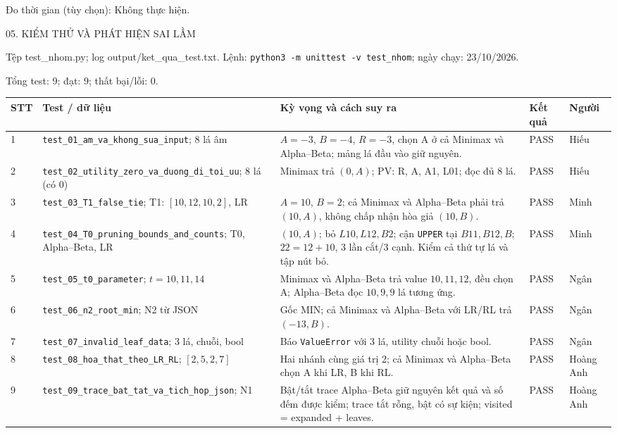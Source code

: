 \documentclass[11pt,a4paper]{article}
\newcommand{\pagehead}[1]{\clearpage\begin{tcolorbox}[colback=Ink,colframe=Ink,coltext=white,fontupper=\sffamily\large\bfseries,arc=1mm]#1\end{tcolorbox}}
\newcommand{\code}[1]{\nolinkurl{#1}}
\begin{document}
Đo thời gian (tùy chọn): Không thực hiện.\par\medskip
\pagehead{05. KIỂM THỬ VÀ PHÁT HIỆN SAI LẦM}
Tệp test\_nhom.py; log output/ket\_qua\_test.txt. Lệnh: \texttt{python3 -m unittest -v test\_nhom}; ngày chạy: 23/10/2026.\par Tổng test: 9; đạt: 9; thất bại/lỗi: 0.\par\medskip
\begingroup\footnotesize\renewcommand{\arraystretch}{1.45}\begin{tabularx}{\linewidth}{p{9mm}Xp{48mm}p{21mm}p{18mm}}\toprule
\textbf{STT} & \textbf{Test / dữ liệu} & \textbf{Kỳ vọng và cách suy ra} & \textbf{Kết quả} & \textbf{Người}\\\midrule
1 & \code{test_01_am_va_khong_sua_input}; 8 lá âm & $A=-3$, $B=-4$, $R=-3$, chọn A ở cả Minimax và Alpha--Beta; mảng lá đầu vào giữ nguyên. & PASS & Hiếu\\
2 & \code{test_02_utility_zero_va_duong_di_toi_uu}; 8 lá (có 0) & Minimax trả $(0,A)$; PV: R, A, A1, L01; đọc đủ 8 lá. & PASS & Hiếu\\
3 & \code{test_03_T1_false_tie}; T1: $[10,12,10,2]$, LR & $A=10$, $B=2$; cả Minimax và Alpha--Beta phải trả $(10,A)$, không chấp nhận hòa giả $(10,B)$. & PASS & Minh\\
4 & \code{test_04_T0_pruning_bounds_and_counts}; T0, Alpha--Beta, LR & $(10,A)$; bỏ $L10,L12,B2$; cận \texttt{UPPER} tại $B11,B12,B$; $22=12+10$, 3 lần cắt/3 cạnh. Kiểm cả thứ tự lá và tập nút bỏ. & PASS & Minh\\
5 & \code{test_05_t0_parameter}; $t=10,11,14$ & Minimax và Alpha--Beta trả value $10,11,12$, đều chọn A; Alpha--Beta đọc $10,9,9$ lá tương ứng. & PASS & Ngân\\
6 & \code{test_06_n2_root_min}; N2 từ JSON & Gốc MIN; cả Minimax và Alpha--Beta với LR/RL trả $(-13,B)$. & PASS & Ngân\\
7 & \code{test_07_invalid_leaf_data}; 3 lá, chuỗi, bool & Báo \code{ValueError} với 3 lá, utility chuỗi hoặc bool. & PASS & Ngân\\
8 & \code{test_08_hoa_that_theo_LR_RL}; $[2,5,2,7]$ & Hai nhánh cùng giá trị 2; cả Minimax và Alpha--Beta chọn A khi LR, B khi RL. & PASS & Hoàng Anh\\
9 & \code{test_09_trace_bat_tat_va_tich_hop_json}; N1 & Bật/tắt trace Alpha--Beta giữ nguyên kết quả và số đếm được kiểm; trace tắt rỗng, bật có sự kiện; visited = expanded + leaves. & PASS & Hoàng Anh\\
\bottomrule\end{tabularx}\endgroup\par\medskip
\end{document}

